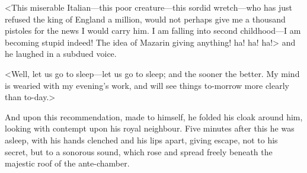 <This miserable Italian—this poor creature—this sordid wretch—who has just refused the king of England a million, would not perhaps give me a thousand pistoles for the news I would carry him.  I am falling into second childhood—I am becoming stupid indeed! The idea of Mazarin giving anything! ha! ha! ha!> and he laughed in a subdued voice.

<Well, let us go to sleep—let us go to sleep; and the sooner the better. My mind is wearied with my evening's work, and will see things to-morrow more clearly than to-day.>

And upon this recommendation, made to himself, he folded his cloak around him, looking with contempt upon his royal neighbour. Five minutes after this he was asleep, with his hands clenched and his lips apart, giving escape, not to his secret, but to a sonorous sound, which rose and spread freely beneath the majestic roof of the ante-chamber. 